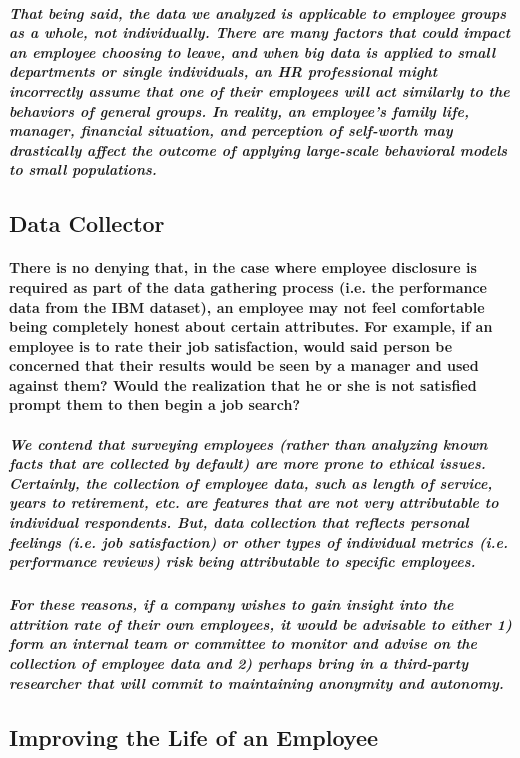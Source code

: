 \documentclass{article}
\begin{document}
\subparagraph{That being said, the data we analyzed is applicable to employee groups as a whole, not individually. There are many factors that could impact an employee choosing to leave, and when big data is applied to small departments or single individuals, an HR professional might incorrectly assume that one of their employees will act similarly to the behaviors of general groups. In reality, an employee’s family life, manager, financial situation, and perception of self-worth may drastically affect the outcome of applying large-scale behavioral models to small populations.}
 
\subsection{Data Collector}

\paragraph{There is no denying that, in the case where employee disclosure is required as part of the data gathering process (i.e. the performance data from the IBM dataset), an employee may not feel comfortable being completely honest about certain attributes. For example, if an employee is to rate their job satisfaction, would said person be concerned that their results would be seen by a manager and used against them? Would the realization that he or she is not satisfied prompt them to then begin a job search?}
 
\subparagraph{We contend that surveying employees (rather than analyzing known facts that are collected by default) are more prone to ethical issues. Certainly, the collection of employee data, such as length of service, years to retirement, etc. are features that are not very attributable to individual respondents. But, data collection that reflects personal feelings (i.e. job satisfaction) or other types of individual metrics (i.e. performance reviews) risk being attributable to specific employees.}
 
\subparagraph{For these reasons, if a company wishes to gain insight into the attrition rate of their own employees, it would be advisable to either 1) form an internal team or committee to monitor and advise on the collection of employee data and 2) perhaps bring in a third-party researcher that will commit to maintaining anonymity and autonomy.}
 
\subsection{Improving the Life of an Employee}
\end{document}
